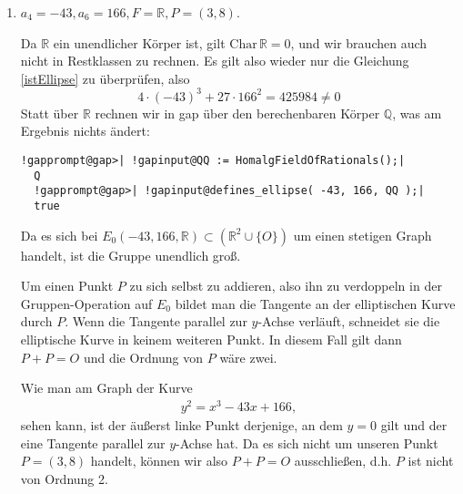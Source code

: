 \begin{enumerate}[label=\alph*)]
\item $a_{4} = -43, a_{6} = 166, F = \mathbb{R}, P = (3, 8)$.

Da $\mathbb{R}$ ein unendlicher Körper ist, gilt $\mathrm{Char}\,\mathbb{R} = 0$, und wir brauchen auch nicht in Restklassen zu rechnen.
Es gilt also wieder nur die Gleichung \eqref{istEllipse} zu überprüfen, also
\[
4\cdot (-43)^{3} + 27\cdot 166^{2} = 425984 \neq 0
\]
Statt über $\mathbb{R}$ rechnen wir in gap über den berechenbaren Körper $\mathbb{Q}$, was am Ergebnis nichts ändert:

\begin{Verbatim}[commandchars=!@|,fontsize=\small,frame=single,label=Example]
  !gapprompt@gap>| !gapinput@QQ := HomalgFieldOfRationals();|
  Q
  !gapprompt@gap>| !gapinput@defines_ellipse( -43, 166, QQ );|
  true
\end{Verbatim}

Da es sich bei $E_{0}( -43, 166, \mathbb{R}) \subset (\mathbb{R}^{2} \cup \{O\})$ um einen stetigen Graph handelt, ist die Gruppe
unendlich groß.

Um einen Punkt $P$ zu sich selbst zu addieren, also ihn zu verdoppeln in der Gruppen-Operation auf $E_{0}$ bildet man die Tangente an der
elliptischen Kurve durch $P$. Wenn die Tangente parallel zur $y$-Achse verläuft, schneidet sie die elliptische Kurve in keinem weiteren Punkt.
In diesem Fall gilt dann $P + P = O$ und die Ordnung von $P$ wäre zwei.

Wie man am Graph der Kurve
\begin{align*}
y^2 = x^{3} - 43x + 166,
\end{align*}
sehen kann, ist der äußerst linke Punkt derjenige, an dem $y = 0$ gilt und der eine Tangente parallel zur $y$-Achse hat.
Da es sich nicht um unseren Punkt $P = (3, 8)$ handelt, können wir also $P + P = O$ ausschließen, d.h. $P$ ist nicht von Ordnung 2.


\end{enumerate}
